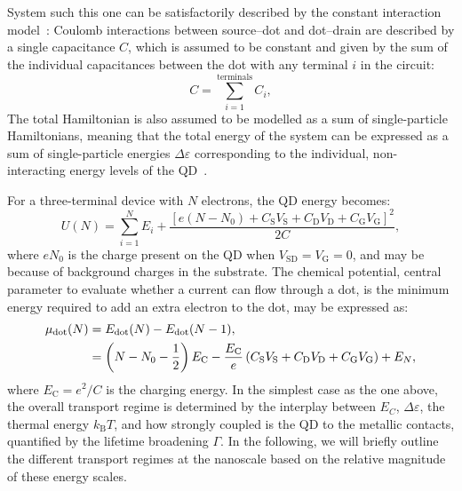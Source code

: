 System such this one can be satisfactorily described by the constant interaction model~\cite{zimmerli1992noise}: Coulomb interactions between source--dot and dot--drain are described by a single capacitance $C$, which is assumed to be constant and given by the sum of the individual capacitances between the dot with any terminal $i$ in the circuit:
%
\begin{equation}\label{ch:theory:eq:capacitance_interaction_model}
    C = \sum_{i=1}^\textrm{terminals} C_i,
\end{equation}
%
The total Hamiltonian is also assumed to be modelled as a sum of single-particle Hamiltonians, meaning that the total energy of the system can be expressed as a sum of single-particle energies $\Delta\varepsilon$ corresponding to the individual, non-interacting energy levels of the \gls{QD}~\cite{laird2015quantum}.

For a three-terminal device with $N$ electrons, the \gls{QD} energy becomes:
%
\begin{equation}\label{ch:theory:eq:total_dot_energy}
    U(N) = \sum_{i=1}^NE_i + \frac{[e(N-N_0) + C_\mathrm{S}V_\mathrm{S} + C_\mathrm{D}V_\mathrm{D} + C_\mathrm{G}V_\mathrm{G}]^{2}}{2C},
\end{equation}
%
where $eN_0$ is the charge present on the \gls{QD} when $V_\textrm{SD}=V_\textrm{G}=0$, and may be because of background charges in the substrate. The chemical potential, central parameter to evaluate whether a current can flow through a dot, is the minimum energy required to add an extra electron to the dot, may be expressed as:
%
\begin{align}
    \mu_\textrm{dot}(N) & = E_\textrm{dot}(N) - E_\mathrm{dot}(N-1), \notag                                                                                                                                       \\
                        & = \left(N-N_{0}-\frac{1}{2}\right) E_{\mathrm{C}}-\frac{E_{\mathrm{C}}}{e}\left(C_{\mathrm{S}} V_{\mathrm{S}}+C_{\mathrm{D}} V_{\mathrm{D}}+C_{\mathrm{G}} V_{\mathrm{G}}\right)+E_{N},
\end{align}
%
where $E_\mathrm{C} = e^2/C$ is the charging energy. In the simplest case as the one above, the overall transport regime is determined by the interplay between $E_C$, $\Delta\varepsilon$, the thermal energy $k_\textrm{B}T$, and how strongly coupled is the \gls{QD} to the metallic contacts, quantified by the  lifetime broadening $\Gamma$. In the following, we will briefly outline the different transport regimes at the nanoscale based on the relative magnitude of these energy scales.

